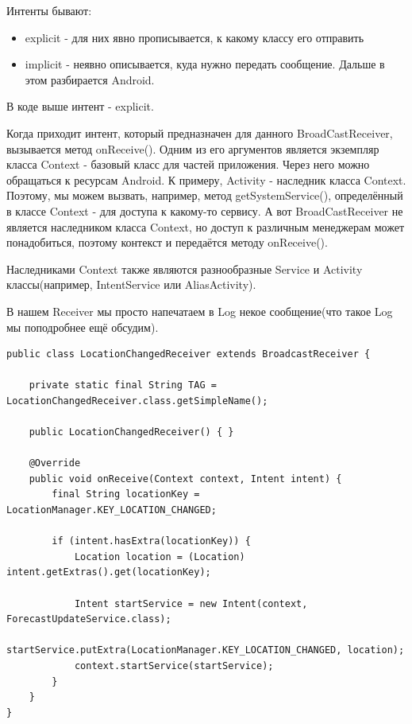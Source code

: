 \documentclass[12 pt]{article}
\begin{document}
      Интенты бывают:
      \begin{itemize}
      		\item explicit - для них явно прописывается, к какому классу его отправить
            \item implicit - неявно описывается, куда нужно передать сообщение. Дальше в этом разбирается Android.
      \end{itemize}
      В коде выше интент - explicit. 
    
    Когда приходит интент, который предназначен для данного BroadCastReceiver, вызывается метод onReceive(). Одним из его аргументов является экземпляр класса Context - базовый класс для частей приложения. Через него можно обращаться к ресурсам Android. К примеру, Activity - наследник класса Context. Поэтому, мы можем вызвать, например, метод getSystemService(), определённый в классе Context - для доступа к какому-то сервису. А вот BroadCastReceiver не является наследником класса Context, но доступ к различным менеджерам может понадобиться, поэтому контекст и передаётся методу onReceive(). 
    
    Наследниками Context также являются разнообразные Service и Activity классы(например, IntentService или AliasActivity).
    
        В нашем Receiver мы просто напечатаем в Log некое сообщение(что такое Log мы поподробнее ещё обсудим). 
        
        \begin{lstlisting}
public class LocationChangedReceiver extends BroadcastReceiver {

    private static final String TAG = LocationChangedReceiver.class.getSimpleName();

    public LocationChangedReceiver() { }

    @Override
    public void onReceive(Context context, Intent intent) {
        final String locationKey = LocationManager.KEY_LOCATION_CHANGED;

        if (intent.hasExtra(locationKey)) {
            Location location = (Location) intent.getExtras().get(locationKey);

            Intent startService = new Intent(context, ForecastUpdateService.class);
            startService.putExtra(LocationManager.KEY_LOCATION_CHANGED, location);
            context.startService(startService);
        }
    }
}
    \end{lstlisting}
    
\end{document}
